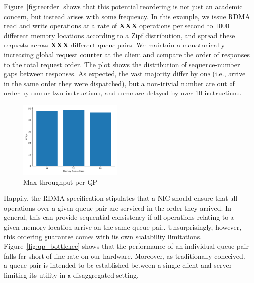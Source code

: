 Figure~\ref{fig:reorder} shows that this potential reordering is not
just an academic concern, but instead arises with some frequency.  In
this example, we issue RDMA read and write operations at a rate of
\textbf{XXX} operations per second to 1000 different memory
locations according to a Zipf distribution, and spread these requests
across \textbf{XXX} different queue pairs.  We maintain a monotonically
increasing global request counter at the client and compare the order
of responses to the total request order.  The plot shows the
distribution of sequence-number gaps between responses.  As expected,
the vast majority differ by one (i.e., arrive in the same order they
were dispatched), but a non-trivial number are out of order by one or
two instructions, and some are delayed by over 10 instructions.


\begin{figure}[t]
    \includegraphics[width=0.45\textwidth]{fig/qp_bottleneck.pdf}
    \caption{Max throughput per QP }
    \label{fig:qp_bottleneck}
\end{figure}

Happily, the RDMA specification stipulates that a NIC should ensure
that all operations over a given queue pair are serviced in the order
they arrived.  In general, this can provide sequential consistency if
all operations relating to a given memory location arrive on the same
queue pair.  Unsurprisingly, however, this ordering guarantee comes
with its own scalability limitations.  Figure~\ref{fig:qp_bottlenec}
shows that the performance of an individual queue pair falls far short
of line rate on our hardware.  Moreover, as traditionally conceived, a
queue pair is intended to be established between a single client and
server---limiting its utility in a disaggregated setting.

